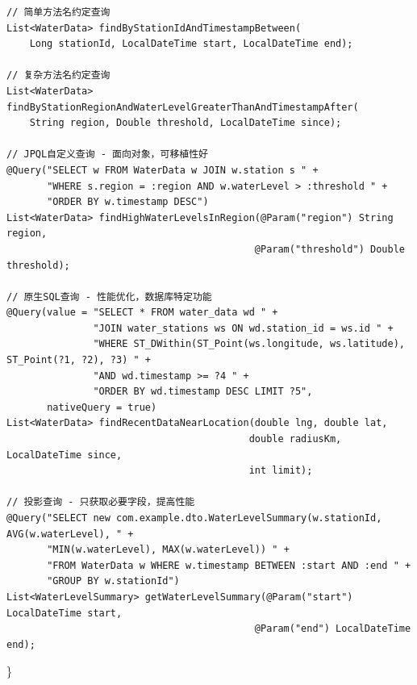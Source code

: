 \begin{verbatim}
// 简单方法名约定查询
List<WaterData> findByStationIdAndTimestampBetween(
    Long stationId, LocalDateTime start, LocalDateTime end);

// 复杂方法名约定查询
List<WaterData> findByStationRegionAndWaterLevelGreaterThanAndTimestampAfter(
    String region, Double threshold, LocalDateTime since);

// JPQL自定义查询 - 面向对象，可移植性好
@Query("SELECT w FROM WaterData w JOIN w.station s " +
       "WHERE s.region = :region AND w.waterLevel > :threshold " +
       "ORDER BY w.timestamp DESC")
List<WaterData> findHighWaterLevelsInRegion(@Param("region") String region,
                                           @Param("threshold") Double threshold);

// 原生SQL查询 - 性能优化，数据库特定功能
@Query(value = "SELECT * FROM water_data wd " +
               "JOIN water_stations ws ON wd.station_id = ws.id " +
               "WHERE ST_DWithin(ST_Point(ws.longitude, ws.latitude), ST_Point(?1, ?2), ?3) " +
               "AND wd.timestamp >= ?4 " +
               "ORDER BY wd.timestamp DESC LIMIT ?5",
       nativeQuery = true)
List<WaterData> findRecentDataNearLocation(double lng, double lat, 
                                          double radiusKm, LocalDateTime since, 
                                          int limit);

// 投影查询 - 只获取必要字段，提高性能
@Query("SELECT new com.example.dto.WaterLevelSummary(w.stationId, AVG(w.waterLevel), " +
       "MIN(w.waterLevel), MAX(w.waterLevel)) " +
       "FROM WaterData w WHERE w.timestamp BETWEEN :start AND :end " +
       "GROUP BY w.stationId")
List<WaterLevelSummary> getWaterLevelSummary(@Param("start") LocalDateTime start,
                                           @Param("end") LocalDateTime end);
\end{verbatim}

\}

